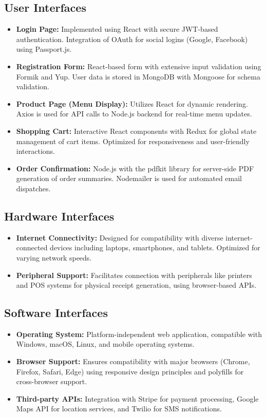 \documentclass{article}
\begin{document}
\subsection{User Interfaces}
\begin{itemize}
    \item \textbf{Login Page:} Implemented using React with secure JWT-based authentication. Integration of OAuth for social logins (Google, Facebook) using Passport.js.
    \item \textbf{Registration Form:} React-based form with extensive input validation using Formik and Yup. User data is stored in MongoDB with Mongoose for schema validation.
    \item \textbf{Product Page (Menu Display):} Utilizes React for dynamic rendering. Axios is used for API calls to Node.js backend for real-time menu updates.
    \item \textbf{Shopping Cart:} Interactive React components with Redux for global state management of cart items. Optimized for responsiveness and user-friendly interactions.
    \item \textbf{Order Confirmation:} Node.js with the pdfkit library for server-side PDF generation of order summaries. Nodemailer is used for automated email dispatches.
\end{itemize}

\subsection{Hardware Interfaces}
\begin{itemize}
    \item \textbf{Internet Connectivity:} Designed for compatibility with diverse internet-connected devices including laptops, smartphones, and tablets. Optimized for varying network speeds.
    \item \textbf{Peripheral Support:} Facilitates connection with peripherals like printers and POS systems for physical receipt generation, using browser-based APIs.
\end{itemize}

\subsection{Software Interfaces}
\begin{itemize}
    \item \textbf{Operating System:} Platform-independent web application, compatible with Windows, macOS, Linux, and mobile operating systems.
    \item \textbf{Browser Support:} Ensures compatibility with major browsers (Chrome, Firefox, Safari, Edge) using responsive design principles and polyfills for cross-browser support.
    \item \textbf{Third-party APIs:} Integration with Stripe for payment processing, Google Maps API for location services, and Twilio for SMS notifications.
\end{itemize}
\end{document}
